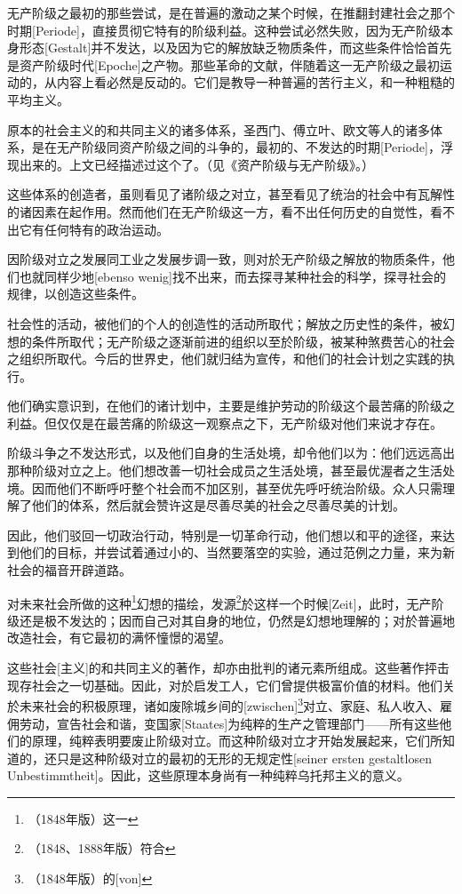 \documentclass[a4paper,12pt]{ctexart}
\begin{document}
无产阶级之最初的那些尝试，是在普遍的激动之某个时候，在推翻封建社会之那个时期[Periode]，直接贯彻它特有的阶级利益。这种尝试必然失败，因为无产阶级本身形态[Gestalt]并不发达，以及因为它的解放缺乏物质条件，而这些条件恰恰首先是资产阶级时代[Epoche]之产物。那些革命的文献，伴随着这一无产阶级之最初运动的，从内容上看必然是反动的。它们是教导一种普遍的苦行主义，和一种粗糙的平均主义。

原本的社会主义的和共同主义的诸多体系，圣西门、傅立叶、欧文等人的诸多体系，是在无产阶级同资产阶级之间的斗争的，最初的、不发达的时期[Periode]，浮现出来的。上文已经描述过这个了。（见《资产阶级与无产阶级》。）

这些体系的创造者，虽则看见了诸阶级之对立，甚至看见了统治的社会中有瓦解性的诸因素在起作用。然而他们在无产阶级这一方，看不出任何历史的自觉性，看不出它有任何特有的政治运动。

因阶级对立之发展同工业之发展步调一致，则对於无产阶级之解放的物质条件，他们也就同样少地[ebenso wenig]找不出来，而去探寻某种社会的科学，探寻社会的规律，以创造这些条件。

社会性的活动，被他们的个人的创造性的活动所取代；解放之历史性的条件，被幻想的条件所取代；无产阶级之逐渐前进的组织以至於阶级，被某种煞费苦心的社会之组织所取代。今后的世界史，他们就归结为宣传，和他们的社会计划之实践的执行。

他们确实意识到，在他们的诸计划中，主要是维护劳动的阶级这个最苦痛的阶级之利益。但仅仅是在最苦痛的阶级这一观察点之下，无产阶级对他们来说才存在。


阶级斗争之不发达形式，以及他们自身的生活处境，却令他们以为：他们远远高出那种阶级对立之上。他们想改善一切社会成员之生活处境，甚至最优渥者之生活处境。因而他们不断呼吁整个社会而不加区别，甚至优先呼吁统治阶级。众人只需理解了他们的体系，然后就会赞许这是尽善尽美的社会之尽善尽美的计划。

因此，他们驳回一切政治行动，特别是一切革命行动，他们想以和平的途径，来达到他们的目标，并尝试着通过小的、当然要落空的实验，通过范例之力量，来为新社会的福音开辟道路。

对未来社会所做的这种\footnote{（1848年版）这一}幻想的描绘，发源\footnote{（1848、1888年版）符合}於这样一个时候[Zeit]，此时，无产阶级还是极不发达的；因而自己对其自身的地位，仍然是幻想地理解的；对於普遍地改造社会，有它最初的满怀憧憬的渴望。

这些社会[主义]的和共同主义的著作，却亦由批判的诸元素所组成。这些著作抨击现存社会之一切基础。因此，对於启发工人，它们曾提供极富价值的材料。他们关於未来社会的积极原理，诸如废除城乡间的[zwischen]\footnote{（1848年版）的[von]}对立、家庭、私人收入、雇佣劳动，宣告社会和谐，变国家[Staates]为纯粹的生产之管理部门——所有这些他们的原理，纯粹表明要废止阶级对立。而这种阶级对立才开始发展起来，它们所知道的，还只是这种阶级对立的最初的无形的无规定性[seiner ersten  gestaltlosen Unbestimmtheit]。因此，这些原理本身尚有一种纯粹乌托邦主义的意义。
\end{document}
